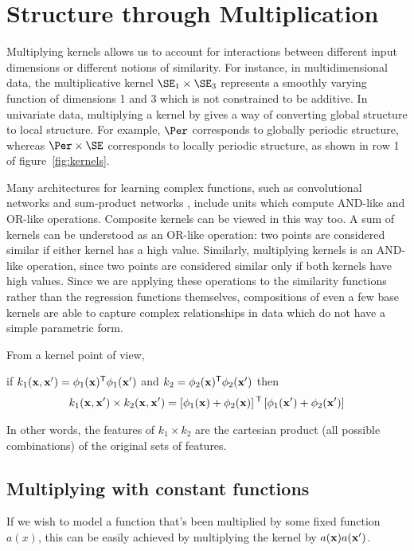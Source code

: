 \section{Structure through Multiplication}

Multiplying kernels allows us to account for interactions between different input dimensions or different notions of similarity. 
For instance, in multidimensional data, the multiplicative kernel $\SE_1 \times \SE_3$ represents a smoothly varying function of dimensions 1 and 3 which is not constrained to be additive.
In univariate data, multiplying a kernel by \kSE{} gives a way of converting global structure to local structure. 
For example, $\Per$ corresponds to globally periodic structure, whereas $\Per \times \SE$ corresponds to locally periodic structure, as shown in row 1 of figure~\ref{fig:kernels}.

Many architectures for learning complex functions, such as convolutional networks \cite{lecun1989backpropagation} and sum-product networks \cite{poon2011sum}, include units which compute AND-like and OR-like operations.
Composite kernels can be viewed in this way too. A sum of kernels can be understood as an OR-like operation: two points are considered similar if either kernel has a high value.
Similarly, multiplying kernels is an AND-like operation, since two points are considered similar only if both kernels have high values.
Since we are applying these operations to the similarity functions rather than the regression functions themselves, compositions of even a few base kernels are able to capture complex relationships in data which do not have a simple parametric form.

From a kernel point of view,

if $k_1({\bf{x}}, {\bf{x}}') = \phi_1({\bf{x}}){^\mathsf{T}} \phi_1({\bf{x}}')$ and $k_2 = \phi_2({\bf{x}}){^\mathsf{T}} \phi_2({\bf{x}}')$
then
%
\begin{align}
k_1({\bf{x}}, {\bf{x}}') \times k_2({\bf{x}}, {\bf{x}}') = \left[\phi_1({\bf{x}}) + \phi_2({\bf{x}})\right]{^\ensuremath{\mathsf{T}}} \left[ \phi_1({\bf{x}}') + \phi_2({\bf{x}}') \right]
\end{align}

In other words, the features of $k_1 \times k_2$ are the cartesian product (all possible combinations) of the original sets of features.


\subsection{Multiplying with constant functions}

If we wish to model a function that's been multiplied by some fixed function $a(x)$, this can be easily achieved by multiplying the kernel by $a({\bf{x}}) a({\bf{x}}')$.


